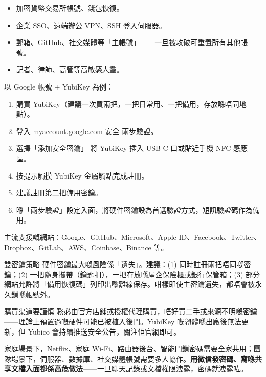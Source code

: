 
\begin{itemize}
  \item 加密貨幣交易所帳號、錢包恢復。
  \item 企業 SSO、遠端辦公 VPN、SSH 登入伺服器。
  \item 郵箱、GitHub、社交媒體等「主帳號」——一旦被攻破可重置所有其他帳號。
  \item 記者、律師、高管等高敏感人羣。
\end{itemize}


以 Google 帳號 + YubiKey 為例：

\begin{enumerate}
  \item 購買 YubiKey（建議一次買兩把，一把日常用、一把備用，存放喺唔同地點）。
  \item 登入 myaccount.google.com 安全 兩步驗證。
  \item 選擇「添加安全密鑰」 將 YubiKey 插入 USB-C 口或貼近手機 NFC 感應區。
  \item 按提示觸摸 YubiKey 金屬觸點完成註冊。
  \item 建議註冊第二把備用密鑰。
  \item 喺「兩步驗證」設定入面，將硬件密鑰設為首選驗證方式，短訊驗證碼作為備用。
\end{enumerate}

主流支援嘅網站：Google、GitHub、Microsoft、Apple ID、Facebook、Twitter、Dropbox、GitLab、AWS、Coinbase、Binance 等。

\begin{tcbinfo}{雙密鑰策略}
硬件密鑰最大嘅風險係「遺失」。建議：(1) 同時註冊兩把唔同嘅密鑰；(2) 一把隨身攜帶（鑰匙扣），一把存放喺屋企保險櫃或銀行保管箱；(3) 部分網站允許將「備用恢復碼」列印出嚟離線保存。咁樣即使主密鑰遺失，都唔會被永久鎖喺帳號外。

\end{tcbinfo}

\begin{tcbwarn}{購買渠道要謹慎}
務必由官方店鋪或授權代理購買，唔好買二手或來源不明嘅密鑰——理論上預置過嘅硬件可能已被植入後門。YubiKey 嘅韌體喺出廠後無法更新，但 Yubico 會持續推送安全公告，關注佢官網即可。

\end{tcbwarn}


家庭場景下，Netflix、家庭 Wi-Fi、路由器後台、智能門鎖密碼需要全家共用；團隊場景下，伺服器、數據庫、社交媒體帳號需要多人協作。\textbf{用微信發密碼、寫喺共享文檔入面都係高危做法}——一旦聊天記錄或文檔權限洩露，密碼就洩露咗。


